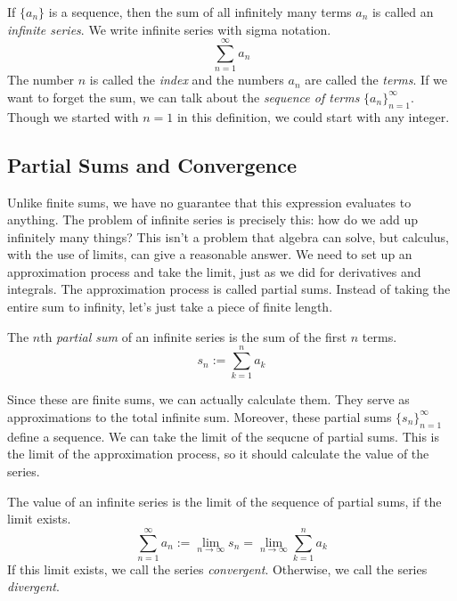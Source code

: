\documentclass[fleqn,letterpaper]{report}
\begin{document}
\begin{defn}If $\{a_n\}$ is a sequence, then the sum of all
infinitely many terms $a_n$ is called an \emph{infinite series}.
We write infinite series with sigma notation.
\begin{equation*}
\sum_{n=1}^\infty a_n 
\end{equation*}
The number $n$
is called the \emph{index} and the numbers $a_n$ are called
the \emph{terms}. If we want to forget the sum, we can talk
about the \emph{sequence of terms} $\{a_n\}_{n=1}^\infty$.
Though we started with $n=1$ in this definition, we could
start with any integer.
\end{defn}

\subsection{Partial Sums and Convergence}
\label{convergence}

Unlike finite sums, we have no guarantee that this expression
evaluates to anything. The problem of infinite series is
precisely this: how do we add up infinitely many things? This
isn't a problem that algebra can solve, but calculus, with the
use of limits, can give a reasonable answer. We need to set
up an approximation process and take the limit, just as we did
for derivatives and integrals. The approximation process is
called partial sums. Instead of taking the entire sum to
infinity, let's just take a piece of finite length. 

\begin{defn}The $n$th \emph{partial sum} of an
infinite series is the sum of the first $n$ terms.
\begin{equation*}
s_n := \sum_{k=1}^n a_k
\end{equation*}\end{defn}
Since these are finite sums, we can actually calculate them.
They serve as approximations to the total infinite sum. 
Moreover, these partial sums $\{s_n\}_{n=1}^\infty$ define a
sequence. We can take the limit of the sequcne of partial
sums. This is the limit of the approximation process, so it
should calculate the value of the series. 

\begin{defn} The value of an infinite series is the limit of
the sequence of partial sums, if the limit exists. 
\begin{equation*}
\sum_{n=1}^\infty a_n := \lim_{n \rightarrow \infty} s_n =
\lim_{n \rightarrow \infty} \sum_{k=1}^n a_k
\end{equation*} 
If this limit exists, we call the series \emph{convergent}.
Otherwise, we call the series \emph{divergent}.
\end{defn}
\end{document}
